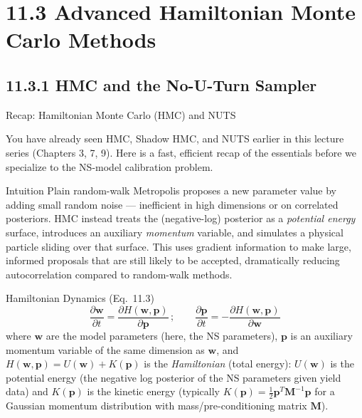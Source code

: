\documentclass[aspectratio=169,10pt]{beamer}
\newcommand{\ww}{\mathbf{w}}
\newcommand{\pp}{\mathbf{p}}
\begin{document}
\section{11.3 Advanced Hamiltonian Monte Carlo Methods}

\subsection{11.3.1 HMC and the No-U-Turn Sampler}

\begin{frame}[allowframebreaks]{Recap: Hamiltonian Monte Carlo (HMC) and NUTS}

You have already seen HMC, Shadow HMC, and NUTS earlier in this lecture
series (Chapters 3, 7, 9). Here is a fast, efficient recap of the essentials
before we specialize to the NS-model calibration problem.

\begin{block}{Intuition}
  Plain random-walk Metropolis proposes a new parameter value by adding
  small random noise --- inefficient in high dimensions or on correlated
  posteriors. HMC instead treats the (negative-log) posterior as a
  \emph{potential energy} surface, introduces an auxiliary \emph{momentum}
  variable, and simulates a physical particle sliding over that surface.
  This uses gradient information to make large, informed proposals that are
  still likely to be accepted, dramatically reducing autocorrelation
  compared to random-walk methods.
\end{block}

\begin{block}{Hamiltonian Dynamics (Eq.\ 11.3)}
  \[
    \frac{\partial \ww}{\partial t} = \frac{\partial H(\ww,\pp)}{\partial \pp}\,; \qquad
    \frac{\partial \pp}{\partial t} = -\frac{\partial H(\ww,\pp)}{\partial \ww}
  \]
  where $\ww$ are the model parameters (here, the NS parameters), $\pp$ is
  an auxiliary momentum variable of the same dimension as $\ww$, and
  $H(\ww,\pp) = U(\ww) + K(\pp)$ is the \emph{Hamiltonian} (total energy):
  $U(\ww)$ is the potential energy (the negative log posterior of the NS
  parameters given yield data) and $K(\pp)$ is the kinetic energy (typically
  $K(\pp) = \tfrac12 \pp^T \mathbf{M}^{-1}\pp$ for a Gaussian momentum
  distribution with mass/pre-conditioning matrix $\mathbf{M}$).
\end{block}


\end{frame}
\end{document}
